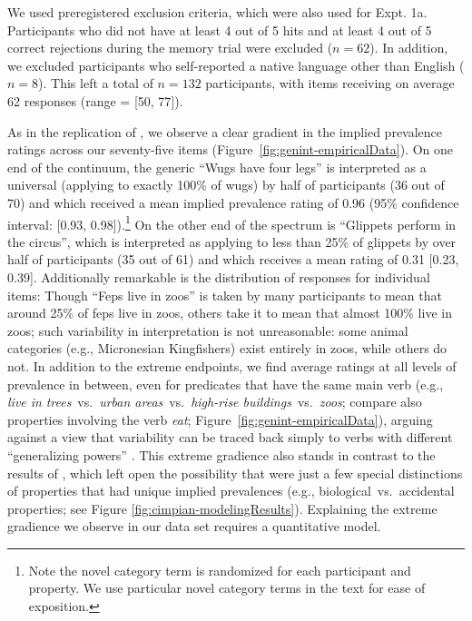 \documentclass[floatsintext,doc]{apa6}
\let\rmarkdownfootnote\footnote%
\def\footnote{\protect\rmarkdownfootnote}
\begin{document}
We used preregistered exclusion criteria, which were also used for Expt. 1a.
Participants who did not have at least 4 out of 5 hits and at least 4 out of 5 correct rejections during the memory trial were excluded (\(n = 62\)).
In addition, we excluded participants who self-reported a native language other than English (\(n = 8\)).
This left a total of \(n = 132\) participants, with items receiving on average 62 responses (range = {[}50, 77{]}).

As in the replication of , we observe a clear gradient in the implied prevalence ratings across our seventy-five items (Figure~\ref{fig:genint-empiricalData}).
On one end of the continuum, the generic \enquote{Wugs have four legs} is interpreted as a universal (applying to exactly 100\% of wugs) by half of participants (36 out of 70) and which received a mean implied prevalence rating of 0.96 (95\% confidence interval: [0.93, 0.98]).\footnote{Note the novel category term is randomized for each participant and property. We use particular novel category terms in the text for ease of exposition.}
On the other end of the spectrum is \enquote{Glippets perform in the circus}, which is interpreted as applying to less than 25\% of glippets by over half of participants (35 out of 61) and which receives a mean rating of 0.31 [0.23, 0.39].
Additionally remarkable is the distribution of responses for individual items: Though \enquote{Feps live in zoos} is taken by many participants to mean that around 25\% of feps live in zoos, others take it to mean that almost 100\% live in zoos; such variability in interpretation is not unreasonable: some animal categories (e.g., Micronesian Kingfishers) exist entirely in zoos, while others do not.
In addition to the extreme endpoints, we find average ratings at all levels of prevalence in between, even for predicates that have the same main verb (e.g., \emph{live in} \emph{trees}~vs.~\emph{urban areas}~vs.~\emph{high-rise buildings}~vs.~\emph{zoos}; compare also properties involving the verb \emph{eat}; Figure~\ref{fig:genint-empiricalData}), arguing against a view that variability can be traced back simply to verbs with different ``generalizing powers'' \cite{Abelson1966, Cimpian2010}.
This extreme gradience also stands in contrast to the results of , which left open the possibility that were just a few special distinctions of properties that had unique implied prevalences (e.g., biological~vs.~accidental properties; see Figure \ref{fig:cimpian-modelingResults}). 
Explaining the extreme gradience we observe in our data set requires a quantitative model. 
\end{document}
